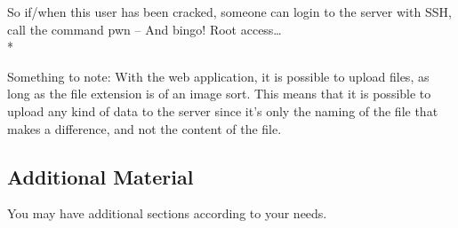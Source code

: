 \documentclass{article}
\begin{document}
So if/when this user has been cracked, someone can login to the server with SSH, call the command pwn – And bingo! Root access…\\*

Something to note:
With the web application, it is possible to upload files, as long as the file extension is of an image sort. This means that it is possible to upload any kind of data to the server since it’s only the naming of the file that makes a difference, and not the content of the file. 



\subsection{Additional Material}

You may have additional sections according to your needs.



\end{document}

